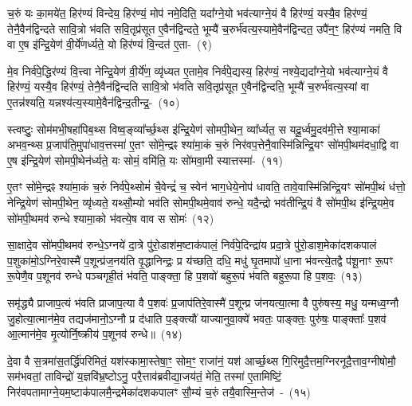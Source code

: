 च॒रुं यः का॒मये॑त॒ हिर॑ण्यं विन्देय॒ हिर॑ण्यं॒ मोप॑ नमे॒दिति॒ यदा᳚ग्ने॒यो भव॑त्याग्ने॒यं वै हिर॑ण्यं॒ यस्यै॒व हिर॑ण्यं॒ तेनै॒वैन॑द्विन्दते सावि॒त्रो भ॑वति सवि॒तृप्र॑सूत ए॒वैन॑द्विन्दते॒ भूम्यै॑ च॒रुर्भ॑वत्य॒स्यामे॒वैन॑द्विन्दत॒ उपै॑न॒ꣳ॒ हिर॑ण्यं नमति॒ वि वा ए॒ष इ॑न्द्रि॒येण॑ वी॒र्ये॑णर्ध्यते॒ यो हिर॑ण्यं वि॒न्दत॑ ए॒ता-~(९)

मे॒व निर्व॑पे॒द्धिर॑ण्यं वि॒त्त्वा नेन्द्रि॒येण॑ वी॒र्ये॑ण॒ व्यृ॑ध्यत ए॒तामे॒व निर्व॑पे॒द्यस्य॒ हिर॑ण्यं॒ नश्ये॒द्यदा᳚ग्ने॒यो भव॑त्याग्ने॒यं वै हिर॑ण्यं॒ यस्यै॒व हिर॑ण्यं॒ तेनै॒वैन॑द्विन्दति सावि॒त्रो भ॑वति सवि॒तृप्र॑सूत ए॒वैन॑द्विन्दति॒ भूम्यै॑ च॒रुर्भ॑वत्य॒स्यां वा ए॒तन्न॑श्यति॒ यन्नश्य॑त्य॒स्यामे॒वैन॑द्विन्द॒ती\-न्द्र॒-~(१०)

स्त्वष्टुः॒ सोम॑मभी॒षहा॑पिब॒थ्स विष्व॒ङ्व्या᳚र्च्छ॒थ्स इ॑न्द्रि॒येण॑ सोमपी॒थेन॒ व्या᳚र्ध्यत॒ स यदू॒र्ध्वमु॒दव॑मी॒त्ते श्या॒माका॑ अभव॒न्थ्स प्र॒जा\-प॑ति॒मुपा॑धाव॒त्तस्मा॑ ए॒तꣳ सो॑मे॒न्द्रꣴ श्या॑मा॒कं च॒रुं निर॑वप॒त्तेनै॒वास्मि॑न्निन्द्रि॒यꣳ सो॑मपी॒थम॑दधा॒द्वि वा ए॒ष इ॑न्द्रि॒येण॑ सोमपी॒थेन॑र्ध्यते॒ यः सोमं॒ वमि॑ति॒ यः सो॑मवा॒मी स्यात्तस्मा॑-~(११)

ए॒तꣳ सो॑मे॒न्द्रꣴ श्या॑मा॒कं च॒रुं निर्व॑पे॒थ्सोमं॑ चै॒वेन्द्रं॑ च॒ स्वेन॑ भाग॒धेये॒नोप॑ धावति॒ तावे॒वास्मि॑न्निन्द्रि॒यꣳ सो॑मपी॒थं ध॑त्तो॒ नेन्द्रि॒येण॑ सोमपी॒थेन॒ व्यृ॑ध्यते॒ यथ्सौ॒म्यो भव॑ति सोमपी॒थमे॒वाव॑ रुन्धे॒ यदै॒न्द्रो भव॑तीन्द्रि॒यं वै सो॑मपी॒थ इ॑न्द्रि॒यमे॒व सो॑मपी॒थमव॑ रुन्धे श्यामा॒को भ॑वत्ये॒ष वाव स सोमः॑~(१२)

सा॒क्षादे॒व सो॑मपी॒थमव॑ रुन्धे॒\-ऽग्नये॑ दा॒त्रे पु॑रो॒डाश॑म॒ष्टा\-क॑पालं॒ निर्व॑पे॒दिन्द्रा॑य प्रदा॒त्रे पु॑रो॒डाश॒मेका॑\-दश\-कपालं प॒शुका॑मो॒\-ऽग्निरे॒वास्मै॑ प॒शून्प्र॑ज॒नय॑ति वृ॒द्धानिन्द्रः॒ प्र य॑च्छति॒ दधि॒ मधु॑ घृ॒तमापो॑ धा॒ना भ॑वन्त्ये॒तद्वै प॑शू॒नाꣳ रू॒पꣳ रू॒पेणै॒व प॒शूनव॑ रुन्धे पञ्चगृही॒तं भ॑वति॒ पाङ्क्ता॒ हि प॒शवो॑ बहुरू॒पं भ॑वति बहुरू॒पा हि प॒शवः॒~(१३)

समृ॑द्ध्यै प्राजाप॒त्यं भ॑वति प्राजाप॒त्या वै प॒शवः॑ प्र॒जा\-प॑तिरे॒वास्मै॑ प॒शून्प्र ज॑नयत्या॒त्मा वै पुरु॑षस्य॒ मधु॒ यन्मध्व॒ग्नौ जु॒होत्या॒त्मान॑मे॒व तद्यज॑मानो॒\-ऽग्नौ प्र द॑धाति प॒ङ्क्त्यौ॑ याज्यानुवा॒क्ये॑ भवतः॒ पाङ्क्तः॒ पुरु॑षः॒ पाङ्क्ताः᳚ प॒शव॑ आ॒त्मान॑मे॒व मृ॒त्योर्नि॒ष्क्रीय॑ प॒शूनव॑ रुन्धे॥~(१४)

{\anuvakamend[{इ॒न्द्रि॒ये᳚\-ऽस्मि॒न्भूम्या॑ ए॒तामिन्द्रः॒ स्यात्तस्मै॒ सोमो॑ बहुरू॒पा हि प॒शव॒ एक॑चत्वारिꣳशच्च}]}%

दे॒वा वै स॒त्रमा॑स॒तर्द्धि॑परिमितं॒ यश॑स्कामा॒स्तेषा॒ꣳ॒ सोम॒ꣳ॒ राजा॑नं॒ यश॑ आर्च्छ॒थ्स गि॒रिमुदै॒त्तम॒ग्निरनूदै॒त्ताव॒ग्नी\-षोमौ॒ सम॑भवतां॒ ताविन्द्रो॑ य॒ज्ञवि॑भ्र॒ष्टो\-ऽनु॒ परै॒त्ताव॑ब्रवीद्या॒जय॑तं॒ मेति॒ तस्मा॑ ए॒तामिष्टिं॒ निर॑वपता\-माग्ने॒य\-म॒ष्टाक॑पाल\-मै॒न्द्रमेका॑\-दश\-कपालꣳ सौ॒म्यं च॒रुं तयै॒वास्मि॒न्तेज॑~-~(१५)

